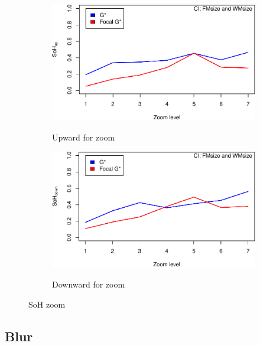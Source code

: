 \documentclass{itatnew}
\begin{document}
\begin{figure}[htp]
  \begin{subfigure}{\linewidth}
    \caption{Upward for zoom}
    \includegraphics[width=\linewidth]{images/gen-zoom-sohup-1}
    \label{fig:UpwardZoom}
  \end{subfigure}
  \hspace{1em}
  \begin{subfigure}{\linewidth}
    \caption{Downward for zoom}
    \includegraphics[width=\linewidth]{images/gen-zoom-sohdown-1}
    \label{fig:DownwardZoom}
  \end{subfigure}
  \caption{SoH zoom}
  \label{fig:Zoom}
\end{figure}


\subsection{Blur}
\end{document}
